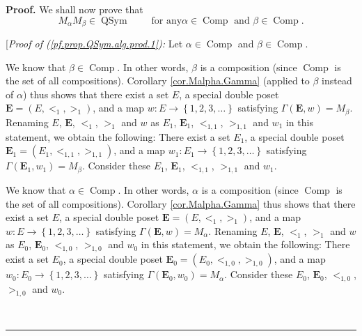 \documentclass[numbers=enddot,12pt,final,onecolumn,notitlepage,abstracton]{scrartcl}
\theoremstyle{definition}
\newenvironment{proof}[1][Proof]{\noindent\textbf{#1.} }{\ \rule{0.5em}{0.5em}}
\newenvironment{verlong}{}{}
\begin{document}
\begin{verlong}
\begin{footnotesize}
\begin{proof}
We shall now prove that
\begin{equation}
M_{\alpha}M_{\beta}\in\operatorname*{QSym}\ \ \ \ \ \ \ \ \ \ \text{for any
}\alpha\in\operatorname*{Comp}\text{ and }\beta\in\operatorname*{Comp}.
\label{pf.prop.QSym.alg.prod.1}%
\end{equation}


[\textit{Proof of (\ref{pf.prop.QSym.alg.prod.1}):} Let $\alpha\in
\operatorname*{Comp}$ and $\beta\in\operatorname*{Comp}$.

We know that $\beta\in\operatorname*{Comp}$. In other words, $\beta$ is a
composition (since $\operatorname*{Comp}$ is the set of all compositions).
Corollary \ref{cor.Malpha.Gamma} (applied to $\beta$ instead of $\alpha$) thus
shows that there exist a set $E$, a special double poset ${\mathbf{E}}=\left(
E,<_{1},>_{1}\right)  $, and a map $w:E\rightarrow\left\{  1,2,3,\ldots
\right\}  $ satisfying $\Gamma\left(  {\mathbf{E}},w\right)  =M_{\beta}$.
Renaming $E$, $\mathbf{E}$, $<_{1}$, $>_{1}$ and $w$ as $E_{1}$,
$\mathbf{E}_{1}$, $<_{1,1}$, $>_{1,1}$ and $w_{1}$ in this statement, we
obtain the following: There exist a set $E_{1}$, a special double poset
$\mathbf{E}_{1}=\left(  E_{1},<_{1,1},>_{1,1}\right)  $, and a map
$w_{1}:E_{1}\rightarrow\left\{  1,2,3,\ldots\right\}  $ satisfying
$\Gamma\left(  {\mathbf{E}}_{1},w_{1}\right)  =M_{\beta}$. Consider these
$E_{1}$, $\mathbf{E}_{1}$, $<_{1,1}$, $>_{1,1}$ and $w_{1}$.

We know that $\alpha\in\operatorname*{Comp}$. In other words, $\alpha$ is a
composition (since $\operatorname*{Comp}$ is the set of all compositions).
Corollary \ref{cor.Malpha.Gamma} thus shows that there exist a set $E$, a
special double poset ${\mathbf{E}}=\left(  E,<_{1},>_{1}\right)  $, and a map
$w:E\rightarrow\left\{  1,2,3,\ldots\right\}  $ satisfying $\Gamma\left(
{\mathbf{E}},w\right)  =M_{\alpha}$. Renaming $E$, $\mathbf{E}$, $<_{1}$,
$>_{1}$ and $w$ as $E_{0}$, $\mathbf{E}_{0}$, $<_{1,0}$, $>_{1,0}$ and $w_{0}$
in this statement, we obtain the following: There exist a set $E_{0}$, a
special double poset $\mathbf{E}_{0}=\left(  E_{0},<_{1,0},>_{1,0}\right)  $,
and a map $w_{0}:E_{0}\rightarrow\left\{  1,2,3,\ldots\right\}  $ satisfying
$\Gamma\left(  {\mathbf{E}}_{0},w_{0}\right)  =M_{\alpha}$. Consider these
$E_{0}$, $\mathbf{E}_{0}$, $<_{1,0}$, $>_{1,0}$ and $w_{0}$.


\end{proof}
\end{footnotesize}
\end{verlong}
\end{document}
